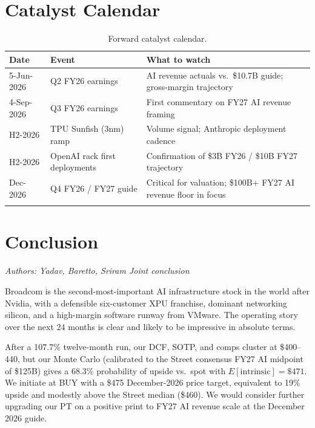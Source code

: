 \documentclass[10pt,letterpaper]{article}
\newcommand{\sectionbyline}[2]{%
\begin{flushright}\vspace{-0.6em}%
{\footnotesize\color{nyugrey}\textit{#1 \textbar{} #2}}%
\end{flushright}\vspace{-0.4em}}
\begin{document}
\section{Catalyst Calendar}

\begin{table}[!ht]
\centering
\small
{}
\begin{tabular}{p{2.6cm}p{4.5cm}p{8.0cm}}
\arrayrulecolor{nyuviolet}\toprule
\rowcolor{nyuviolet}\color{white}\textbf{Date} & \color{white}\textbf{Event} & \color{white}\textbf{What to watch} \\
\midrule
5-Jun-2026  & Q2 FY26 earnings    & AI revenue actuals vs.\ \$10.7B guide; gross-margin trajectory \\
4-Sep-2026  & Q3 FY26 earnings    & First commentary on FY27 AI revenue framing \\
H2-2026     & TPU Sunfish (3nm) ramp & Volume signal; Anthropic deployment cadence \\
H2-2026     & OpenAI rack first deployments & Confirmation of \$3B FY26 / \$10B FY27 trajectory \\
Dec-2026    & Q4 FY26 / FY27 guide & Critical for valuation; \$100B+ FY27 AI revenue floor in focus \\
\arrayrulecolor{nyuviolet}\bottomrule
\end{tabular}
\caption{Forward catalyst calendar.}
\end{table}

\section{Conclusion}
\sectionbyline{Authors: Yadav, Baretto, Sriram}{Joint conclusion}

Broadcom is the second-most-important AI infrastructure stock in the world after Nvidia, with a defensible six-customer XPU franchise, dominant networking silicon, and a high-margin software runway from VMware. The operating story over the next 24 months is clear and likely to be impressive in absolute terms.

After a 107.7\% twelve-month run, our DCF, SOTP, and comps cluster at \$400--440, but our Monte Carlo (calibrated to the Street consensus FY27 AI midpoint of \$125B) gives a 68.3\% probability of upside vs.\ spot with $E[\text{intrinsic}] = \$471$. We initiate at BUY with a \$475 December-2026 price target, equivalent to 19\% upside and modestly above the Street median (\$460). We would consider further upgrading our PT on a positive print to FY27 AI revenue scale at the December 2026 guide.
\end{document}
